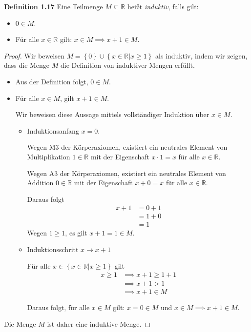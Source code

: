 \documentclass[12pt]{extarticle}
\begin{document}
\textbf{Definition 1.17}
Eine Teilmenge \(M \subseteq \mathbb{R}\) heißt \textit{induktiv},
falls gilt:
\begin{itemize}
\item \(0 \in M\).
\item Für alle \(x \in \mathbb{R}\) gilt: $x \in M \implies x+1
  \in M$.
\end{itemize}
\begin{proof}

  Wir beweisen $M = \left\{ 0 \right\} \cup \left\{ x \in \mathbb{R}
    | x \geq 1 \right\}$ als induktiv, indem wir zeigen, dass die
  Menge \(M\) die Definition von induktiver Mengen erfüllt.

  \begin{itemize}
  \item Aus der Definition folgt, \(0 \in M\).
  \item Für alle \(x \in M\), gilt \(x + 1 \in M\).

    Wir beweisen diese Aussage mittels vollständiger Induktion
    über \(x \in M\).

    \begin{itemize}
    \item Induktionsanfang \(x = 0\).

      Wegen M3 der Körperaxiomen, existiert ein neutrales Element
      von Multiplikation \(1 \in \mathbb{R}\) mit der Eigenschaft
      \(x \cdot 1 = x\) für alle \(x \in \mathbb{R}\).

      Wegen A3 der Körperaxiomen, existiert ein neutrales Element
      von Addition \(0 \in \mathbb{R}\) mit der Eigenschaft
      \(x + 0 = x\) für alle \(x \in \mathbb{R}\).

      Daraus folgt
      \begin{align*}
        x+1 &= 0+1\\
            &= 1+0 \tag*{A2}\\
            &= 1 \tag*{A3}
      \end{align*}
      Wegen \(1 \geq 1\), es gilt \(x + 1 =1 \in M\).
    \item Induktionsschritt \(x \rightarrow x + 1\)

      Für alle \(x \in \left\{ x \in \mathbb{R} | x \geq 1 \right\}\) gilt
      \begin{align*}
        x \geq 1 &\implies x+1 \geq 1+1 \tag*{O3}\\
                 &\implies x+1 > 1 \tag*{O2}\\
                 &\implies x+1 \in M \tag*{Definition von \(M\)}
      \end{align*}

      Daraus folgt, für alle \(x \in M\) gilt: \(x = 0 \in M\) und $x \in M
      \implies x+1 \in M$.
    \end{itemize}
  \end{itemize}
  Die Menge \(M\) ist daher eine induktive Menge.
\end{proof}
\end{document}
